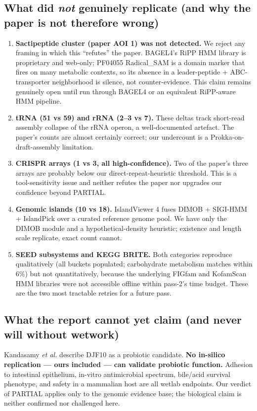 \documentclass[11pt]{article}
\begin{document}
\subsection*{What did \emph{not} genuinely replicate (and why the paper is not therefore wrong)}
\begin{enumerate}
  \item \textbf{Sactipeptide cluster (paper AOI 1) was not detected.} We reject any framing in which this ``refutes'' the paper. BAGEL4's RiPP HMM library is proprietary and web-only; PF04055 Radical\_SAM is a domain marker that fires on many metabolic contexts, so its absence in a leader-peptide + ABC-transporter neighborhood is silence, not counter-evidence. This claim remains genuinely open until run through BAGEL4 or an equivalent RiPP-aware HMM pipeline.
  \item \textbf{tRNA (51 vs 59) and rRNA (2--3 vs 7).} These deltas track short-read assembly collapse of the rRNA operon, a well-documented artefact. The paper's counts are almost certainly correct; our undercount is a Prokka-on-draft-assembly limitation.
  \item \textbf{CRISPR arrays (1 vs 3, all high-confidence).} Two of the paper's three arrays are probably below our direct-repeat-heuristic threshold. This is a tool-sensitivity issue and neither refutes the paper nor upgrades our confidence beyond PARTIAL.
  \item \textbf{Genomic islands (10 vs 18).} IslandViewer 4 fuses DIMOB + SIGI-HMM + IslandPick over a curated reference genome pool. We have only the DIMOB module and a hypothetical-density heuristic; existence and length scale replicate, exact count cannot.
  \item \textbf{SEED subsystems and KEGG BRITE.} Both categories reproduce qualitatively (all buckets populated; carbohydrate metabolism matches within 6\%) but not quantitatively, because the underlying FIGfam and KofamScan HMM libraries were not accessible offline within pass-2's time budget. These are the two most tractable retries for a future pass.
\end{enumerate}

\subsection*{What the report cannot yet claim (and never will without wetwork)}
Kandasamy \emph{et al.} describe DJF10 as a probiotic candidate. \textbf{No in-silico replication --- ours included --- can validate probiotic function.} Adhesion to intestinal epithelium, in-vitro antimicrobial spectrum, bile/acid survival phenotype, and safety in a mammalian host are all wetlab endpoints. Our verdict of PARTIAL applies only to the genomic evidence base; the biological claim is neither confirmed nor challenged here.
\end{document}

